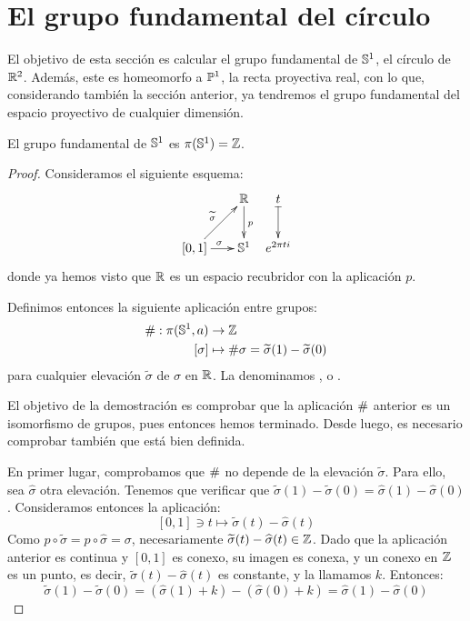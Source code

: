 \section{El grupo fundamental del círculo}

El objetivo de esta sección es calcular el grupo fundamental de $\mathbb{S}^1$, el círculo de $\mathbb{R}^2$. Además, este es homeomorfo a $\mathbb{P}^1$, la recta proyectiva real, con lo que, considerando también la sección anterior, ya tendremos el grupo fundamental del espacio proyectivo de cualquier dimensión.

\begin{theo}
\label{grf_circulo}

El grupo fundamental de $\mathbb{S}^1$ es $\pi(\mathbb{S}^1)=\mathbb{Z}$.

\begin{proof}
Consideramos el siguiente esquema:
\[\xymatrix @C = 0.5pc {
&&\R \ar[d]^p & t \ar@{|->}[d] \\
[0,1] \ar[rr]^\sigma \ar[rru]^{\widetilde{\sigma}} & & \Sfe^1 & e^{2\pi ti}
}\]
donde ya hemos visto que $\mathbb{R}$ es un espacio recubridor con la aplicación $p$.

Definimos entonces la siguiente aplicación entre grupos:
\[\begin{split}
\mathrm{\#}:\pi(\mathbb{S}^1,a)&\to\mathbb{Z} \\
[\sigma] &\mapsto \mathrm{\#}\sigma = \widetilde{\sigma}(1)-\widetilde{\sigma}(0)
\end{split}\]
para cualquier elevación $\widetilde{\sigma}$ de $\sigma$ en $\mathbb{R}$. La denominamos ,  o .

El objetivo de la demostración es comprobar que la aplicación $\mathrm{\#}$ anterior es un isomorfismo de grupos, pues entonces hemos terminado. Desde luego, es necesario comprobar también que está bien definida.

En primer lugar, comprobamos que $\mathrm{\#}$ no depende de la elevación $\widetilde{\sigma}$. Para ello, sea $\widehat{\sigma}$ otra elevación. Tenemos que verificar que $\widetilde{\sigma}(1)-\widetilde{\sigma}(0) = \widehat{\sigma}(1) - \widehat{\sigma}(0)$. Consideramos entonces la aplicación:
\[[0,1]\ni t\mapsto \widetilde{\sigma}(t) - \widehat{\sigma}(t)\]
Como $p\circ\widetilde{\sigma} = p\circ\widehat{\sigma} = \sigma$, necesariamente $\widetilde{\sigma}(t) - \widehat{\sigma}(t)\in\mathbb{Z}$. Dado que la aplicación anterior es continua y $[0,1]$ es conexo, su imagen es conexa, y un conexo en $\mathbb{Z}$ es un punto, es decir, $\widetilde{\sigma}(t) - \widehat{\sigma}(t)$ es constante, y la llamamos $k$. Entonces:
\[\widetilde{\sigma}(1)-\widetilde{\sigma}(0) = (\widehat{\sigma}(1) + k) - (\widehat{\sigma}(0) + k) = \widehat{\sigma}(1) - \widehat{\sigma}(0)\]


\end{proof}
\end{theo}
